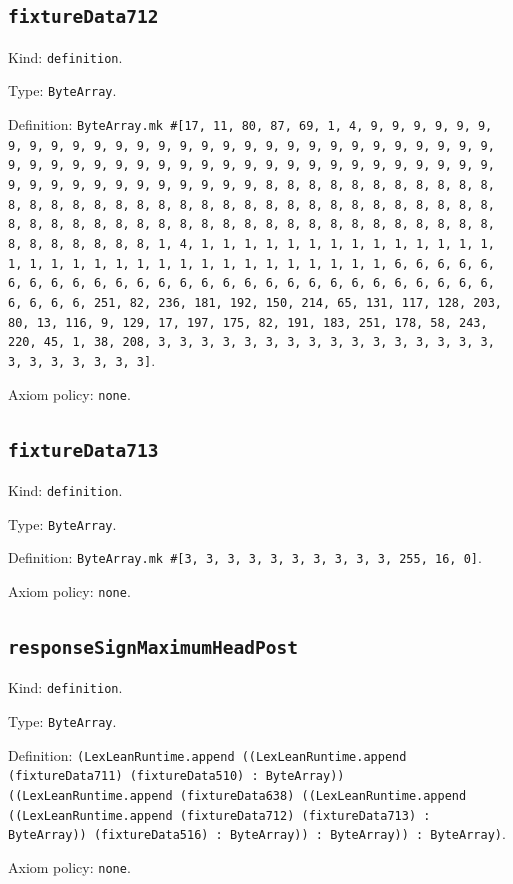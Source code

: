 \documentclass[11pt]{article}
\begin{document}
\subsection*{\texttt{fixtureData712}}
\noindent Kind: \texttt{definition}.\par
\noindent Type: \texttt{ByteArray}.\par
\noindent Definition: \texttt{ByteArray.mk \#[17, 11, 80, 87, 69, 1, 4, 9, 9, 9, 9, 9, 9, 9, 9, 9, 9, 9, 9, 9, 9, 9, 9, 9, 9, 9, 9, 9, 9, 9, 9, 9, 9, 9, 9, 9, 9, 9, 9, 9, 9, 9, 9, 9, 9, 9, 9, 9, 9, 9, 9, 9, 9, 9, 9, 9, 9, 9, 9, 9, 9, 9, 9, 9, 9, 9, 9, 9, 9, 9, 9, 8, 8, 8, 8, 8, 8, 8, 8, 8, 8, 8, 8, 8, 8, 8, 8, 8, 8, 8, 8, 8, 8, 8, 8, 8, 8, 8, 8, 8, 8, 8, 8, 8, 8, 8, 8, 8, 8, 8, 8, 8, 8, 8, 8, 8, 8, 8, 8, 8, 8, 8, 8, 8, 8, 8, 8, 8, 8, 8, 8, 8, 8, 8, 8, 1, 4, 1, 1, 1, 1, 1, 1, 1, 1, 1, 1, 1, 1, 1, 1, 1, 1, 1, 1, 1, 1, 1, 1, 1, 1, 1, 1, 1, 1, 1, 1, 1, 1, 6, 6, 6, 6, 6, 6, 6, 6, 6, 6, 6, 6, 6, 6, 6, 6, 6, 6, 6, 6, 6, 6, 6, 6, 6, 6, 6, 6, 6, 6, 6, 6, 251, 82, 236, 181, 192, 150, 214, 65, 131, 117, 128, 203, 80, 13, 116, 9, 129, 17, 197, 175, 82, 191, 183, 251, 178, 58, 243, 220, 45, 1, 38, 208, 3, 3, 3, 3, 3, 3, 3, 3, 3, 3, 3, 3, 3, 3, 3, 3, 3, 3, 3, 3, 3, 3, 3]}.\par
\noindent Axiom policy: \texttt{none}.\par
\subsection*{\texttt{fixtureData713}}
\noindent Kind: \texttt{definition}.\par
\noindent Type: \texttt{ByteArray}.\par
\noindent Definition: \texttt{ByteArray.mk \#[3, 3, 3, 3, 3, 3, 3, 3, 3, 3, 255, 16, 0]}.\par
\noindent Axiom policy: \texttt{none}.\par
\subsection*{\texttt{responseSignMaximumHeadPost}}
\noindent Kind: \texttt{definition}.\par
\noindent Type: \texttt{ByteArray}.\par
\noindent Definition: \texttt{(LexLeanRuntime.append ((LexLeanRuntime.append (fixtureData711) (fixtureData510) : ByteArray)) ((LexLeanRuntime.append (fixtureData638) ((LexLeanRuntime.append ((LexLeanRuntime.append (fixtureData712) (fixtureData713) : ByteArray)) (fixtureData516) : ByteArray)) : ByteArray)) : ByteArray)}.\par
\noindent Axiom policy: \texttt{none}.\par
\end{document}
